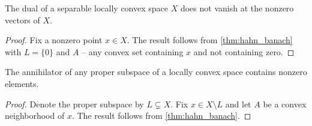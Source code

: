 \begin{corollary}\label{thm:hahn_banach_functionals_vanish_nowhere}
  The dual of a separable locally convex space \( X \) does not vanish at the nonzero vectors of \( X \).
\end{corollary}
\begin{proof}
  Fix a nonzero point \( x \in X \). The result follows from \cref{thm:hahn_banach} with \( L = \{ 0 \} \) and \( A \) -- any convex set containing \( x \) and not containing zero.
\end{proof}

\begin{corollary}\label{thm:hahn_banach_annihilator_nontrivial}
  The annihilator of any proper subspace of a locally convex space contains nonzero elements.
\end{corollary}
\begin{proof}
  Denote the proper subspace by \( L \subsetneq X \). Fix \( x \in X \setminus L \) and let \( A \) be a convex neighborhood of \( x \). The result follows from \cref{thm:hahn_banach}.
\end{proof}
